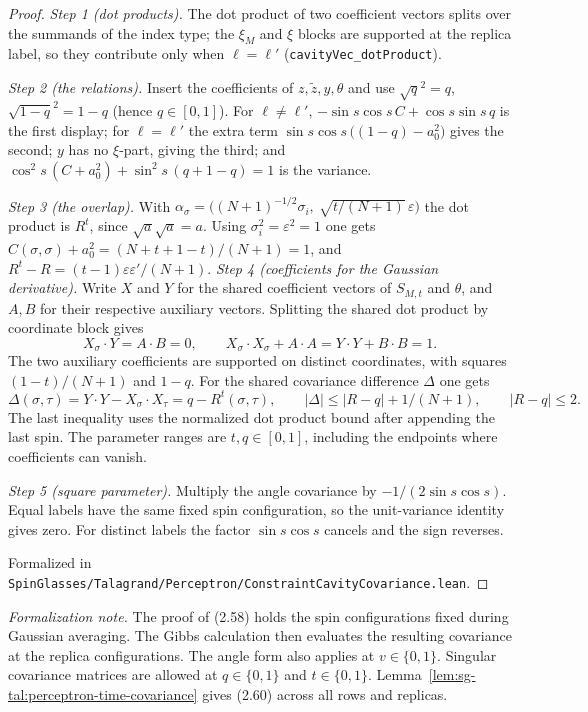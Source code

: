\begin{proof}
  \leanok
\emph{Step 1 (dot products).} The dot product of two coefficient vectors splits over the summands of the index type; the $\xi_M$ and $\xi$ blocks are supported at the replica label,
so they contribute only when $\ell=\ell'$ (\texttt{cavityVec\_dotProduct}).

\emph{Step 2 (the relations).} Insert the coefficients of $z,\tilde z,y,\theta$ and use $\sqrt q^2=q$, $\sqrt{1-q}^2=1-q$ (hence $q\in[0,1]$). For $\ell\ne\ell'$,
$-\sin s\cos s\,C+\cos s\sin s\,q$ is the first display; for $\ell=\ell'$ the extra term $\sin s\cos s\,\bigl((1-q)-a_0^2\bigr)$ gives the second;
$y$ has no $\xi$-part, giving the third; and $\cos^2 s\,(C+a_0^2)+\sin^2 s\,(q+1-q)=1$ is the variance.

\emph{Step 3 (the overlap).} With $\alpha_\sigma=\bigl((N+1)^{-1/2}\sigma_i,\ \sqrt{t/(N+1)}\,\varepsilon\bigr)$ the dot product is $R^t$, since $\sqrt a\sqrt a=a$.
Using $\sigma_i^2=\varepsilon^2=1$ one gets $C(\sigma,\sigma)+a_0^2=(N+t+1-t)/(N+1)=1$, and $R^t-R=(t-1)\varepsilon\varepsilon'/(N+1)$.
\emph{Step 4 (coefficients for the Gaussian derivative).} Write $X$ and $Y$ for the shared
coefficient vectors of $S_{M,t}$ and $\theta$, and $A,B$ for their respective auxiliary vectors.
Splitting the shared dot product by coordinate block gives
\[
 X_\sigma\cdot Y=A\cdot B=0,\qquad
 X_\sigma\cdot X_\sigma+A\cdot A=Y\cdot Y+B\cdot B=1.
\]
The two auxiliary coefficients are supported on distinct coordinates, with squares
$(1-t)/(N+1)$ and $1-q$. For the shared covariance difference $\Delta$ one gets
\[
 \Delta(\sigma,\tau)=Y\cdot Y-X_\sigma\cdot X_\tau=q-R^t(\sigma,\tau),\qquad
 |\Delta|\le |R-q|+1/(N+1),\qquad |R-q|\le 2.
\]
The last inequality uses the normalized dot product bound after appending the last spin.
The parameter ranges are $t,q\in[0,1]$, including the endpoints where coefficients can vanish.

\emph{Step 5 (square parameter).} Multiply the angle covariance by $-1/(2\sin s\cos s)$.
Equal labels have the same fixed spin configuration, so the unit-variance identity gives zero.
For distinct labels the factor $\sin s\cos s$ cancels and the sign reverses.

Formalized in \texttt{SpinGlasses/Talagrand/Perceptron/ConstraintCavityCovariance.lean}.
\end{proof}

\medskip\noindent\emph{Formalization note.} The proof of (2.58) holds the spin configurations
fixed during Gaussian averaging. The Gibbs calculation then evaluates the resulting covariance
at the replica configurations. The angle form also applies at $v\in\{0,1\}$. Singular covariance
matrices are allowed at $q\in\{0,1\}$ and $t\in\{0,1\}$.
Lemma~\ref{lem:sg-tal:perceptron-time-covariance} gives (2.60) across all rows and replicas.

